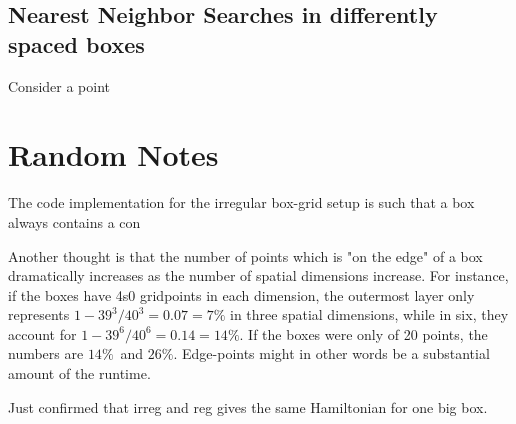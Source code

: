 \documentclass[12p,a4paper]{article}
\begin{document}
\subsection{Nearest Neighbor Searches in differently spaced boxes}
Consider a point 







\newpage
\section{Random Notes}
The code implementation for the irregular box-grid setup is such that a box always contains a con

Another thought is that the number of points which is "on the edge" of a box dramatically increases as the number of spatial dimensions increase. For instance, if the boxes have 4s0 gridpoints in each dimension, the outermost layer only represents $1-39^3/40^3 = 0.07 = 7\%$ in three spatial dimensions, while in six, they account for $1-39^6/40^6 = 0.14 = 14\%$. If the boxes were only of 20 points, the numbers are $14\%$ and $26\%$. Edge-points might in other words be a substantial amount of the runtime.    

Just confirmed that irreg and reg gives the same Hamiltonian for one big box.
\end{document}
